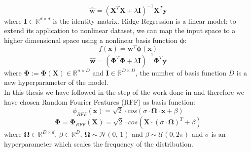 \begin{equation}
    \hat{\mathbf{w}} = (\mathbf{X}^T \mathbf{X} + \lambda \mathbf{I})^{-1} \mathbf{X}^T \mathbf{y}
    \label{eq:closedrr}
\end{equation}
where $\mathbf{I} \in \mathbb{R}^{d \times d}$ is the identity matrix.
Ridge Regression is a linear model: to extend its application to nonlinear dataset, we can map the input space to a higher dimensional space using a nonlinear basis function $\mathbf{\phi}$:
\begin{equation}
    f(\mathbf{x}) = \mathbf{w}^T\mathbf{\phi}(\mathbf{x})
    \label{eq:fmrr}
\end{equation}
\begin{equation}
    \hat{\mathbf{w}} = (\mathbf{\Phi}^T \mathbf{\Phi} + \lambda \mathbf{I})^{-1} \mathbf{\Phi}^T \mathbf{y}
    \label{eq:closedfmrr}
\end{equation}
where $\mathbf{\Phi} := \mathbf{\Phi}(\mathbf{X}) \in \mathbb{R}^{n \times D}$ and $\mathbf{I} \in \mathbb{R}^{D \times D}$, the number of basis function $D$ is a new hyperparameter of the model.\\
In this thesis we have followed in the step of the work done in \cite{Strazzulla2017} and therefore we have chosen Random Fourier Features (RFF) as basis function:
\begin{equation}
    \phi_{RFF}(\mathbf{x}) = \sqrt{2} \cdot cos(\sigma \cdot \mathbf{\Omega} \cdot \mathbf{x} + \beta)
    \label{eq:rff}
\end{equation}
\begin{equation}
    \mathbf{\Phi} = \mathbf{\Phi}_{RFF}(\textbf{X}) = \sqrt{2} \cdot cos(\mathbf{X} \cdot (\sigma \cdot \mathbf{\Omega})^T + \beta)
    \label{eq:matrff}
\end{equation}
where $\mathbf{\Omega} \in \mathbb{R}^{D \times d}$, $\beta \in \mathbb{R}^D$, $\mathbf{\Omega} \sim \mathcal{N}(0,\,1)$ and $\beta \sim \mathcal{U}(0, 2\pi)$ and $\sigma$ is an hyperparameter which scales the frequency of the distribution.